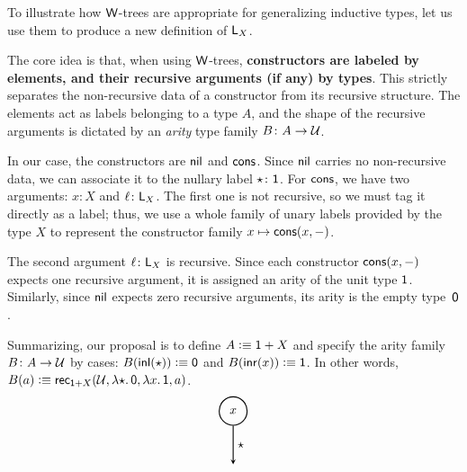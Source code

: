 \begin{xmpl}\label{xmpl:W-tree-for-List(X)}
    To illustrate how $\mathsf{W}$-trees are appropriate for generalizing inductive types, let us use them to produce a new definition of $\mathsf{L}_X$.

    The core idea is that, when using $\mathsf{W}$-trees, \textbf{constructors are labeled by elements, and their recursive arguments (if any) by types}. This strictly separates the non-recursive data of a constructor from its recursive structure. The elements act as labels belonging to a type $A$, and the shape of the recursive arguments is dictated by an \textsl{arity} type family $B\colon A\to\univ$.

    In our case, the constructors are $\mathsf{nil}$ and $\mathsf{cons}$. Since $\mathsf{nil}$ carries no non-recursive data, we can associate it to the nullary label $\fstar\colon\fun1$. For $\mathsf{cons}$, we have two arguments: $x\colon X$ and $\ell\colon\fun L_X$. The first one is not recursive, so we must tag it directly as a label; thus, we use a whole family of unary labels provided by the type $X$ to represent the constructor family $x\mapsto\mathsf{cons}(x,{\mathord-})$.

    The second argument $\ell\colon\fun L_X$ is recursive. Since each constructor $\mathsf{cons}(x,{\mathord-})$ expects one recursive argument, it is assigned an arity of the unit type $\mathsf{1}$. Similarly, since $\mathsf{nil}$ expects zero recursive arguments, its arity is the empty type~$\mathsf{0}$.

    Summarizing, our proposal is to define $A\mathrel{\vcentcolon}\equiv\mathsf{1}+X$ and specify the arity family $B\colon A\to\univ$ by cases: $B(\mathsf{inl}({\mathsf{\star}}))\mathrel{\vcentcolon}\equiv\mathsf{0}$ and $B(\mathsf{inr}(x))\mathrel{\vcentcolon}\equiv\mathsf{1}$. In other words, $B(a)\mathrel{\vcentcolon}\equiv\mathsf{rec}_{\mathsf{1}+X}(\mathcal U,\lambda{{\mathsf{\star}}}.\,\mathsf{0},\lambda x.\,\mathsf{1},a)$.
    \[
        \begin{tikzpicture}[
            scale=0.75,
            >=stealth,
            thick,
            baseline=0]
            \node[circle, draw, minimum size=8mm] (x) at (0,0) {$x$};
        
            \coordinate (t) at (0, -2);
        
            \draw[->] (x) -- node[right] {$\fstar$} (t);
        

\end{tikzpicture}\]
\end{xmpl}
